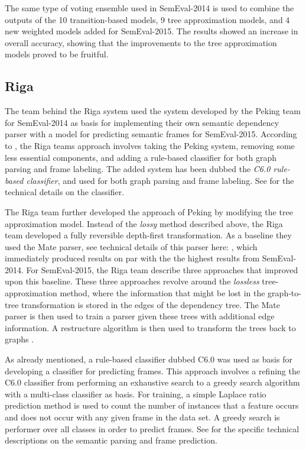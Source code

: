 The same type of voting ensemble used in SemEval-2014 is used to combine the outputs of the 10 transition-based models, 9 tree approximation models, and 4 new weighted models added for SemEval-2015. The results showed an increase in overall accuracy, showing that the improvements to the tree approximation models proved to be fruitful.


\subsection{Riga}

The team behind the Riga system used the system developed by the Peking team for SemEval-2014 as basis for implementing their own semantic dependency parser with a model for predicting semantic frames for SemEval-2015. According to , the Riga teams approach involves taking the Peking system, removing some less essential components, and adding a rule-based classifier for both graph parsing and frame labeling. The added system has been dubbed the \textit{C6.0 rule-based classifier}, and used for both graph parsing and frame labeling. See  for the technical details on the classifier.

The Riga team further developed the approach of Peking by modifying the tree approximation model. Instead of the \textit{lossy} method described above, the Riga team developed a fully reversible depth-first transformation. As a baseline they used the Mate parser, see technical details of this parser here: \cite{Boh:10}, which immediately produced results on par with the the highest results from SemEval-2014. For SemEval-2015, the Riga team describe three approaches that improved upon this baseline. These three approaches revolve around the \textit{lossless} tree-approximation method, where the information that might be lost in the graph-to-tree transformation is stored in the edges of the dependency tree. The Mate parser is then used to train a parser given these trees with additional edge information. A restructure algorithm is then used to transform the trees back to graphs \cite{Barzdins:Riga:15}.

As already mentioned, a rule-based classifier dubbed C6.0 was used as basis for developing a classifier for predicting frames. This approach involves a refining the C6.0 classifier from performing an exhaustive search to a greedy search algorithm with a multi-class classifier as basis. For training, a simple Laplace ratio prediction method is used to count the number of instances that a feature occurs and does not occur with any given frame in the data set. A greedy search is performer over all classes in order to predict frames. See  for the specific technical descriptions on the semantic parsing and frame prediction.

